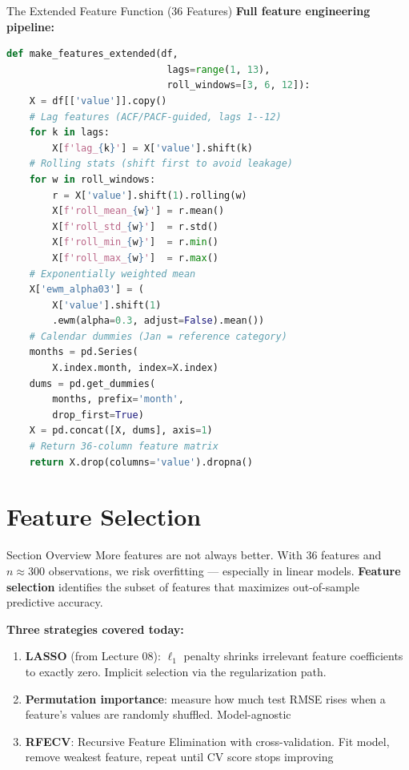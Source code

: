 \documentclass[aspectratio=169, 10pt]{beamer}
\begin{document}
\begin{frame}[fragile]{The Extended Feature Function (36 Features)}
  \textbf{Full feature engineering pipeline:}
  \smallskip
\begin{lstlisting}[language=Python, basicstyle=\tiny\ttfamily]
def make_features_extended(df,
                            lags=range(1, 13),
                            roll_windows=[3, 6, 12]):
    X = df[['value']].copy()
    # Lag features (ACF/PACF-guided, lags 1--12)
    for k in lags:
        X[f'lag_{k}'] = X['value'].shift(k)
    # Rolling stats (shift first to avoid leakage)
    for w in roll_windows:
        r = X['value'].shift(1).rolling(w)
        X[f'roll_mean_{w}'] = r.mean()
        X[f'roll_std_{w}']  = r.std()
        X[f'roll_min_{w}']  = r.min()
        X[f'roll_max_{w}']  = r.max()
    # Exponentially weighted mean
    X['ewm_alpha03'] = (
        X['value'].shift(1)
        .ewm(alpha=0.3, adjust=False).mean())
    # Calendar dummies (Jan = reference category)
    months = pd.Series(
        X.index.month, index=X.index)
    dums = pd.get_dummies(
        months, prefix='month',
        drop_first=True)
    X = pd.concat([X, dums], axis=1)
    # Return 36-column feature matrix
    return X.drop(columns='value').dropna()
\end{lstlisting}
\end{frame}

\section{Feature Selection}


\begin{frame}{Section Overview}
  More features are not always better. With 36 features and
  $n \approx 300$ observations, we risk overfitting --- especially
  in linear models. \textbf{Feature selection} identifies the
  subset of features that maximizes out-of-sample predictive
  accuracy.

  \medskip
  \textbf{Three strategies covered today:}
  \begin{enumerate}
    \item \textbf{LASSO} (from Lecture 08): $\ell_1$ penalty
          shrinks irrelevant feature coefficients to exactly zero.
          Implicit selection via the regularization path.
    \item \textbf{Permutation importance}: measure how much
          test RMSE rises when a feature's values are randomly
          shuffled. Model-agnostic
    \item \textbf{RFECV}: Recursive Feature Elimination with
          cross-validation. Fit model, remove weakest feature,
          repeat until CV score stops improving
  \end{enumerate}
\end{frame}
\end{document}
